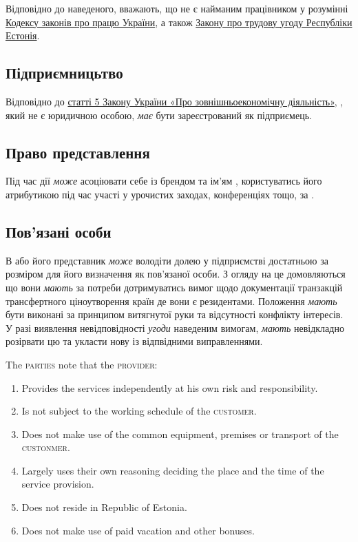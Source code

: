 \begin{Form}
\begin{paracol}{3}
{        Відповідно до наведеного,  вважають, що  не є найманим працівником  у розумінні \href{http://zakon2.rada.gov.ua/laws/show/322-08}{Кодексу законів про працю України}, а також \href{http://zakon24.ee/zakon-o-trudovom-dogovore/}{Закону про трудову угоду Республіки Естонія}.

        \subsection{Підприємницьтво}
        Відповідно до \href{http://zakon3.rada.gov.ua/laws/show/959-12/parao138\#o138}{статті 5 Закону України «Про зовнішньоекономічну діяльність»}, , який не є юридичною особою, \textit{має} бути зареєстрований як підприємець.

        \subsection{Право представлення}
        Під час дії   \textit{може} асоціювати себе із брендом та ім'ям , користуватись його атрибутикою під час участі у урочистих заходах, конференціях тощо, за .

        \subsection{Пов'язані особи}
        В або його представник \textit{може} володіти долею у підприємстві  достатньою за розміром для його визначення як пов’язаної особи. З огляду на це  домовляються що вони \textit{мають} за потреби дотримуватись вимог щодо документації транзакцій трансфертного ціноутворення країн де вони є резидентами. Положення  \textit{мають} бути виконані за принципом витягнутої руки та відсутності конфлікту інтересів. У разі виявлення невідповідності \textit{угоди} наведеним вимогам,  \textit{мають} невідкладно розірвати цю  та укласти нову із відпвідними виправленнями.}
        {The \textsc{parties} note that the \textsc{provider}:
        \begin{enumerate}
          \item Provides the services independently at his own risk and responsibility.
          \item Is not subject to the working schedule of the \textsc{customer}.
          \item Does not make use of the common equipment, premises or transport of the \textsc{custonmer}.
          \item Largely uses their own reasoning deciding the place and the time of the service provision.
          \item Does not reside in Republic of Estonia.
          \item Does not make use of paid vacation and other bonuses.
        \end{enumerate}

}
\end{paracol}
\end{Form}
